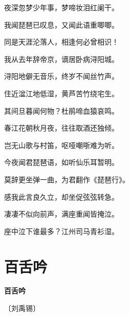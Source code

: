 \documentclass[12pt,UTF-8,openany,fontset=none]{ctexbook}
\begin{document}
\begin{center}
\begin{Large}
        夜深忽梦少年事，梦啼妆泪红阑干。

        我闻琵琶已叹息，又闻此语重唧唧。

        同是天涯沦落人，相逢何必曾相识！

        我从去年辞帝京，谪居卧病浔阳城。

        浔阳地僻无音乐，终岁不闻丝竹声。

        住近湓江地低湿，黄芦苦竹绕宅生。

        其间旦暮闻何物？杜鹃啼血猿哀鸣。

        春江花朝秋月夜，往往取酒还独倾。

        岂无山歌与村笛，呕哑嘲哳难为听。

        今夜闻君琵琶语，如听仙乐耳暂明。

        \hspace{26pt}莫辞更坐弹一曲，为君翻作《琵琶行》。

        感我此言良久立，却坐促弦弦转急。

        凄凄不似向前声，满座重闻皆掩泣。

        座中泣下谁最多？江州司马青衫湿。

    \end{Large}

\end{center}

\vspace{8pt}
\clearpage

\section{百舌吟}


\begin{center}
    {\bfseries 百舌吟}

    \vspace{18pt}

    \begin{large}\xuwen
        〔刘禹锡〕
    \end{large}

\end{center}

    \vspace{18pt}  %
\end{document}

